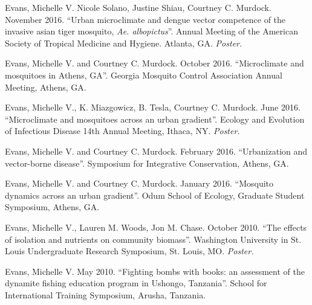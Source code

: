 \begin{cvitems}
	\item Evans, Michelle V. Nicole Solano, Justine Shiau, Courtney C. Murdock. November 2016. ``Urban microclimate and dengue vector competence of the invasive asian tiger mosquito, \textit{Ae. albopictus}''. Annual Meeting of the American Society of Tropical Medicine and Hygiene. Atlanta, GA. \textit{Poster.}

	\item Evans, Michelle V. and Courtney C. Murdock. October 2016. ``Microclimate and mosquitoes in Athens, GA''. Georgia Mosquito Control Association Annual Meeting, Athens, GA.

	\item Evans, Michelle V., K. Miazgowicz, B. Tesla, Courtney C. Murdock. June 2016. ``Microclimate and mosquitoes across an urban gradient''. Ecology and Evolution of Infectious Disease 14th Annual Meeting, Ithaca, NY. \textit{Poster.}

	\item Evans, Michelle V. and Courtney C. Murdock. February 2016. ``Urbanization and vector-borne disease''. Symposium for Integrative Conservation, Athens, GA.

	\item Evans, Michelle V. and Courtney C. Murdock. January 2016. ``Mosquito dynamics across an urban gradient''. Odum School of Ecology, Graduate Student Symposium, Athens, GA.

	\item Evans, Michelle V., Lauren M. Woods, Jon M. Chase. October 2010. ``The effects of isolation and nutrients on community biomass''. Washington University in St. Louis Undergraduate Research Symposium, St. Louis, MO. \textit{Poster.}

	\item Evans, Michelle V. May 2010. ``Fighting bombs with books: an assessment of the dynamite fishing education program in Ushongo, Tanzania''. School for International Training Symposium, Arusha, Tanzania.

	\bigskip
\end{cvitems}
